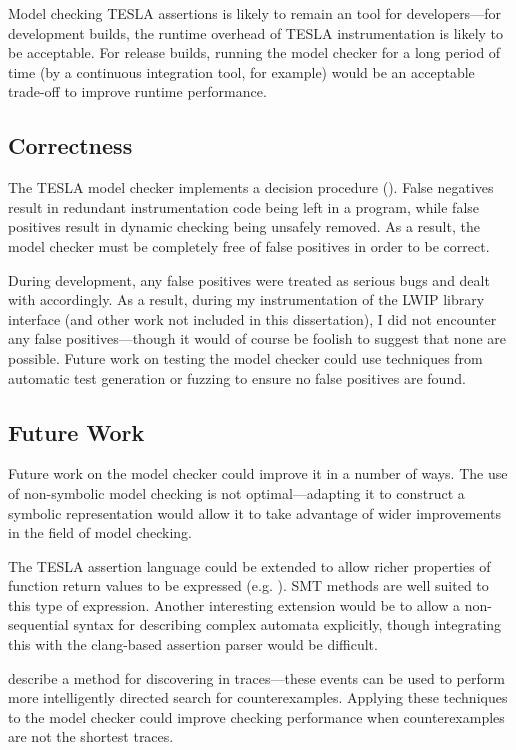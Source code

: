 Model checking TESLA assertions is likely to remain an  tool
for developers---for development builds, the runtime overhead of TESLA
instrumentation is likely to be acceptable. For release builds, running the
model checker for a long period of time (by a continuous integration tool, for
example) would be an acceptable trade-off to improve runtime performance.

\subsection{Correctness}

The TESLA model checker implements a decision procedure (). False negatives result in redundant instrumentation
code being left in a program, while false positives result in dynamic checking
being unsafely removed. As a result, the model checker must be completely free
of false positives in order to be correct.

During development, any false positives were treated as serious bugs and dealt
with accordingly. As a result, during my instrumentation of the LWIP library
interface (and other work not included in this dissertation), I did not
encounter any false positives---though it would of course be foolish to suggest
that none are possible. Future work on testing the model checker could use
techniques from automatic test generation or fuzzing to ensure no false
positives are found.

\subsection{Future Work}

Future work on the model checker could improve it in a number of ways. The use
of non-symbolic model checking is not optimal---adapting it to construct a
symbolic representation would allow it to take advantage of wider improvements
in the field of model checking. 

The TESLA assertion language could be extended to allow richer properties of
function return values to be expressed (e.g. ). SMT methods are well suited to this type
of expression. Another interesting extension would be to allow a non-sequential
syntax for describing complex automata explicitly, though integrating this with
the clang-based assertion parser would be difficult.

\textcite{kashyap_producing_2008} describe a method for discovering
 in traces---these events can be used to perform more
intelligently directed search for counterexamples. Applying these techniques to
the model checker could improve checking performance when counterexamples are
not the shortest traces.

